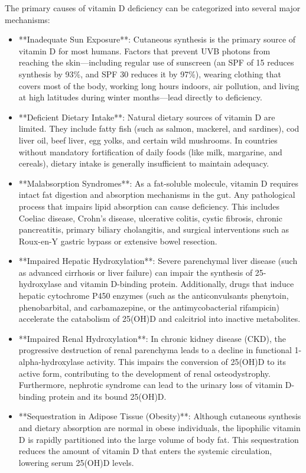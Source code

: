 The primary causes of vitamin D deficiency can be categorized into several major mechanisms:
\begin{itemize}
    \item **Inadequate Sun Exposure**: Cutaneous synthesis is the primary source of vitamin D for most humans. Factors that prevent UVB photons from reaching the skin—including regular use of sunscreen (an SPF of 15 reduces synthesis by 93\%, and SPF 30 reduces it by 97\%), wearing clothing that covers most of the body, working long hours indoors, air pollution, and living at high latitudes during winter months—lead directly to deficiency.
    \item **Deficient Dietary Intake**: Natural dietary sources of vitamin D are limited. They include fatty fish (such as salmon, mackerel, and sardines), cod liver oil, beef liver, egg yolks, and certain wild mushrooms. In countries without mandatory fortification of daily foods (like milk, margarine, and cereals), dietary intake is generally insufficient to maintain adequacy.
    \item **Malabsorption Syndromes**: As a fat-soluble molecule, vitamin D requires intact fat digestion and absorption mechanisms in the gut. Any pathological process that impairs lipid absorption can cause deficiency. This includes Coeliac disease, Crohn's disease, ulcerative colitis, cystic fibrosis, chronic pancreatitis, primary biliary cholangitis, and surgical interventions such as Roux-en-Y gastric bypass or extensive bowel resection.
    \item **Impaired Hepatic Hydroxylation**: Severe parenchymal liver disease (such as advanced cirrhosis or liver failure) can impair the synthesis of 25-hydroxylase and vitamin D-binding protein. Additionally, drugs that induce hepatic cytochrome P450 enzymes (such as the anticonvulsants phenytoin, phenobarbital, and carbamazepine, or the antimycobacterial rifampicin) accelerate the catabolism of 25(OH)D and calcitriol into inactive metabolites.
    \item **Impaired Renal Hydroxylation**: In chronic kidney disease (CKD), the progressive destruction of renal parenchyma leads to a decline in functional 1-alpha-hydroxylase activity. This impairs the conversion of 25(OH)D to its active form, contributing to the development of renal osteodystrophy. Furthermore, nephrotic syndrome can lead to the urinary loss of vitamin D-binding protein and its bound 25(OH)D.
    \item **Sequestration in Adipose Tissue (Obesity)**: Although cutaneous synthesis and dietary absorption are normal in obese individuals, the lipophilic vitamin D is rapidly partitioned into the large volume of body fat. This sequestration reduces the amount of vitamin D that enters the systemic circulation, lowering serum 25(OH)D levels.

\end{itemize}
